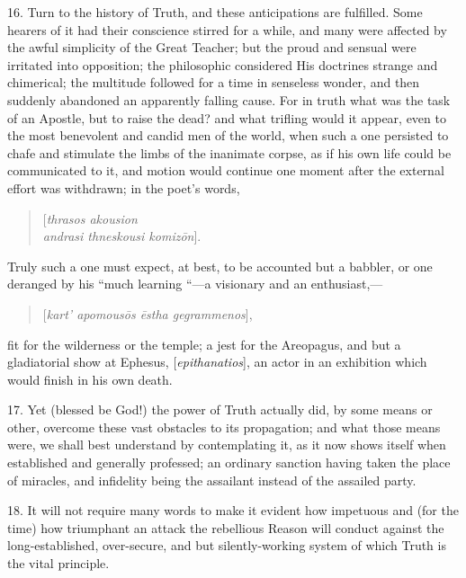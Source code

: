 16. Turn to the history of Truth, and these anticipations are
fulfilled. Some hearers of it had their conscience stirred for a
while, and many were affected by the awful simplicity of the Great
Teacher; but the proud and sensual were irritated into opposition; the
philosophic considered His doctrines strange and chimerical; the
multitude followed for a time in senseless wonder, and then suddenly
abandoned an apparently falling cause. For in truth what was the task
of an Apostle, but to raise the dead? and what trifling would it
appear, even to the most benevolent and candid men of the world, when
such a one persisted to chafe and stimulate the limbs of the inanimate
corpse, as if his own life could be communicated to it, and motion
would continue one moment after the external effort was withdrawn; in
the poet's words,

\begin{quote}

[\emph{thrasos akousion}
\emph{}\\
\emph{andrasi thneskousi komiz\={o}n}].

\end{quote}

Truly such a one must expect, at best, to be accounted but a
babbler, or one deranged by his ``much learning ``—a
visionary and an enthusiast,—

\begin{quote}

[\emph{kart' apomous\={o}s \={e}stha gegrammenos}],

\end{quote}

fit for the wilderness or the temple; a jest for the Areopagus, and
but a gladiatorial show at Ephesus, [\emph{epithanatios}],
an actor in an exhibition which would finish in his own death.

17. Yet (blessed be God!) the power of Truth actually did, by some
means or other, overcome these vast obstacles to its propagation; and
what those means were, we shall best understand by contemplating it,
as it now shows itself when established and generally professed; an
ordinary sanction having taken the place of miracles, and infidelity
being the assailant instead of the assailed party.

18. It will not require many words to make it evident how impetuous
and (for the time) how triumphant an attack the rebellious Reason will
conduct against the long-established, over-secure, and but
silently-working system of which Truth is the vital principle.


